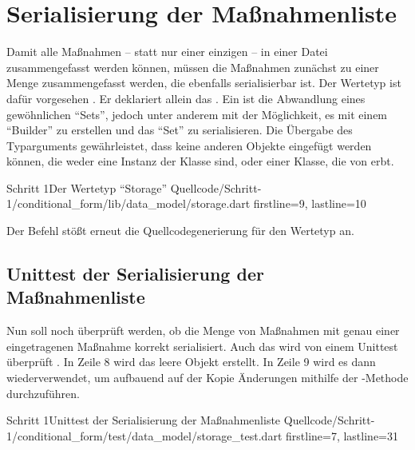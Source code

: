 
\ifodd\value{page}\hbox{}\newpage\fi
\section{Serialisierung der Maßnahmenliste}

Damit alle Maßnahmen -- statt nur einer einzigen -- in einer Datei zusammengefasst werden können, müssen die Maßnahmen zunächst zu einer Menge zusammengefasst werden, die ebenfalls serialisierbar ist.
Der Wertetyp  ist dafür vorgesehen \Lst{\ref{lst:Schritt1WerteTypStorage}}.
Er deklariert allein das  .
Ein  ist die Abwandlung eines gewöhnlichen \enquote{Sets}, jedoch unter anderem mit der Möglichkeit, es mit einem \enquote{Builder} zu erstellen und das \enquote{Set} zu serialisieren.
Die Übergabe des Typarguments  gewährleistet, dass keine anderen Objekte eingefügt werden können, die weder eine Instanz der Klasse  sind, oder einer Klasse, die von  erbt.

\begin{alexlisting}{Schritt 1}{Der Wertetyp \enquote{Storage}}
  {Quellcode/Schritt-1/conditional_form/lib/data_model/storage.dart}
  {firstline=9, lastline=10}
  \label{lst:Schritt1WerteTypStorage}
\end{alexlisting}

Der Befehl   stößt erneut die Quellcodegenerierung für den Wertetyp  an.

\subsection{Unittest der Serialisierung der Maßnahmenliste}

Nun soll noch überprüft werden, ob die Menge von Maßnahmen mit genau einer eingetragenen Maßnahme korrekt serialisiert.
Auch das wird von einem Unittest überprüft \Lst{\ref{lst:Schritt1MassnahmenSerialisierenOhneFehlerUnitTest}}.
In Zeile 8 wird das leere Objekt  erstellt.
In Zeile 9 wird es dann wiederverwendet, um aufbauend auf der Kopie Änderungen mithilfe der -Methode durchzuführen.

\begin{alexlisting}{Schritt 1}{Unittest der Serialisierung der Maßnahmenliste}
  {Quellcode/Schritt-1/conditional_form/test/data_model/storage_test.dart}
  {firstline=7, lastline=31}
  \label{lst:Schritt1MassnahmenSerialisierenOhneFehlerUnitTest}
\end{alexlisting}

